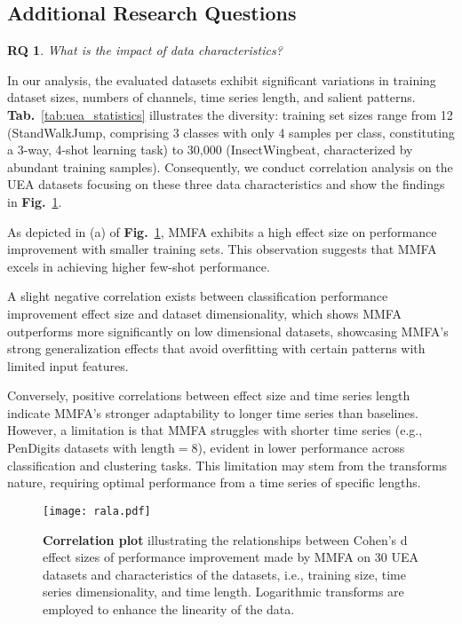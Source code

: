 \documentclass{article}
\newtheorem{researchq}{RQ}
\begin{document}
\subsection{Additional Research Questions}\label{sec:additional_RQs}






\begin{researchq}
What is the impact of data characteristics?
\end{researchq}

In our analysis, the evaluated datasets exhibit significant variations in training dataset sizes, numbers of channels, time series length, and salient patterns. \textbf{Tab.}~\ref{tab:uea_statistics} illustrates the diversity: training set sizes range from 12 (StandWalkJump, comprising 3 classes with only 4 samples per class, constituting a 3-way, 4-shot learning task) to 30,000 (InsectWingbeat, characterized by abundant training samples). Consequently, we conduct correlation analysis on the UEA datasets focusing on these three data characteristics and show the findings in \textbf{Fig.}~\ref{fig:data_char}.

As depicted in (a) of \textbf{Fig.}~\ref{fig:data_char}, MMFA exhibits a high effect size on performance improvement with smaller training sets. This observation suggests that MMFA excels in achieving higher few-shot performance.

A slight negative correlation exists between classification performance improvement effect size and dataset dimensionality, which shows MMFA outperforms more significantly on low dimensional datasets, showcasing MMFA's strong generalization effects that avoid overfitting with certain patterns with limited input features.

Conversely, positive correlations between effect size and time series length indicate MMFA's stronger adaptability to longer time series than baselines. However, a limitation is that MMFA struggles with shorter time series (e.g., PenDigits datasets with $\text{length} = 8$), evident in lower performance across classification and clustering tasks. This limitation may stem from the transforms nature, requiring optimal performance from a time series of specific lengths.

\begin{figure}
    \centering
    \texttt{[image: rala.pdf]}
    \caption{\textbf{Correlation plot} illustrating the relationships between Cohen's d effect sizes of performance improvement made by MMFA on 30 UEA datasets and characteristics of the datasets, i.e., training size, time series dimensionality, and time length. Logarithmic transforms are employed to enhance the linearity of the data.}
    \label{fig:data_char}
\end{figure}
\end{document}
